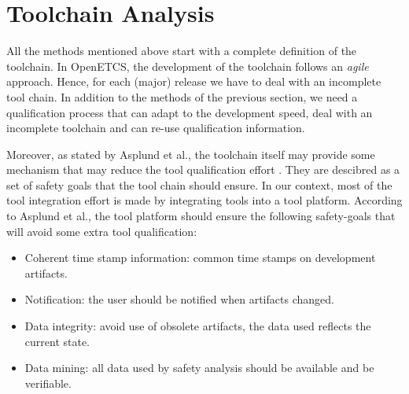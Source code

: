 \section{Toolchain Analysis}
\label{sec:toolchain-analysis}

All the methods mentioned above start with a complete definition of the toolchain. In OpenETCS, the development of the toolchain follows an \emph{agile} approach.
Hence, for each (major) release we have to deal with an incomplete tool
chain. In addition to the methods of the previous section,  we need a qualification
process that can adapt to the development speed, deal with an incomplete toolchain
and can re-use qualification information.

Moreover, as stated by Asplund et al., the toolchain itself may
provide some mechanism that may reduce the tool qualification effort
\cite{asplund_towards_2012,asplund_qualifying_2012}. They are
descibred as a set of safety goals that the tool chain should ensure.
 In our context, most of the
tool integration effort is made by integrating tools into a tool
platform.  According to Asplund et al., the tool platform should
ensure the following safety-goals that will avoid some extra tool qualification:
\begin{itemize}
\item Coherent time stamp information: common time stamps on development artifacts.
\item Notification: the user should be notified when artifacts changed.
\item Data integrity:  avoid use of obsolete artifacts, the data used reflects the
  current state.
\item Data mining: all data used by safety analysis should be available and be
  verifiable.
\end{itemize}


